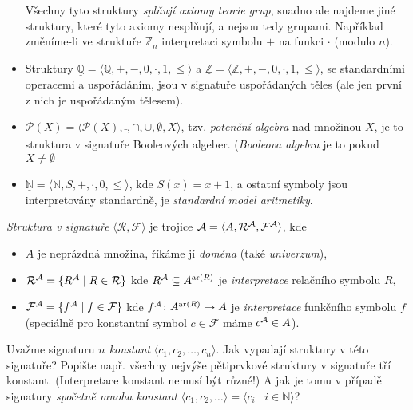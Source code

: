 \begin{example}
\begin{itemize}
\begin{itemize}
    \end{itemize}
    Všechny tyto struktury \emph{splňují axiomy teorie grup}, snadno ale najdeme jiné struktury, které tyto axiomy nesplňují, a nejsou tedy grupami. Například změníme-li ve struktuře $\mathbb Z_n$ interpretaci symbolu $+$ na funkci $\cdot$ (modulo $n$).
    \item Struktury $\underline{\mathbb Q}=\langle \mathbb Q, +, -, 0,\cdot,1,\leq\rangle$ a $\underline{\mathbb Z}=\langle \mathbb Z, +, -, 0,\cdot,1,\leq\rangle$, se standardními operacemi a uspořádáním, jsou v signatuře uspořádaných těles (ale jen první z nich je uspořádaným tělesem).
    \item $\underline{\mathcal P(X)}=\langle \mathcal P(X),\bar{},\cap,\cup,\emptyset,X\rangle$, tzv. \emph{potenční algebra} nad množinou $X$, je to struktura v signatuře Booleových algeber. (\emph{Booleova algebra} je to pokud $X\neq\emptyset$
    \item $\underline{\mathbb N}=\langle \mathbb N,S,+,\cdot,0,\leq\rangle$, kde $S(x)=x+1$, a ostatní symboly jsou interpretovány standardně, je \emph{standardní model aritmetiky}.
\end{itemize}
\end{example}



\begin{definition}[Struktura]
\emph{Struktura v signatuře} $\langle\mathcal R,\mathcal F\rangle$ je trojice $\mathcal{A}=\langle A, \mathcal R^{\mathcal{A}},\mathcal F^{\mathcal{A}} \rangle$, kde
\begin{itemize}
   \item  $A$ je neprázdná množina, říkáme jí \emph{doména} (také \emph{univerzum}),
   \item $\mathcal R^{\mathcal{A}}=\{R^{\mathcal{A}}\mid R\in\mathcal R\}$ kde $R^{\mathcal{A}}\subseteq A^{\mathrm{ar}(R)}$ je \emph{interpretace} relačního symbolu $R$,
   \item $\mathcal F^{\mathcal{A}}=\{f^{\mathcal{A}}\mid f\in\mathcal F\}$ kde $f^{\mathcal{A}}\colon A^{\mathrm{ar}(R)}\to A$ je \emph{interpretace} funkčního symbolu $f$ (speciálně pro konstantní symbol $c\in\mathcal F$ máme $c^{\mathcal{A}}\in A$).
\end{itemize}


\end{definition}


\begin{exercise}
Uvažme signaturu \emph{$n$ konstant} $\langle c_1,c_2,\dots,c_n\rangle$. Jak vypadají struktury v této signatuře? Popište např. všechny nejvýše pětiprvkové struktury v signatuře tří konstant. (Interpretace konstant nemusí být různé!)
A jak je tomu v případě signatury \emph{spočetně mnoha konstant} $\langle c_1,c_2,\dots\rangle=\langle c_i\mid i\in\mathbb N\rangle$?
\end{exercise}


